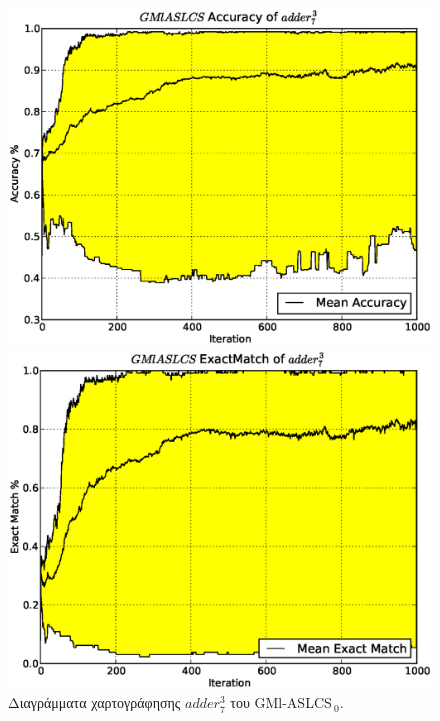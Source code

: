 \begin{figure}[ht]
  \caption{Διαγράμματα χαρτογράφησης $adder_{7}^{3}$ του GMl-ASLCS$_{\:0}$.}
  \label{fig:gmlaslcs0adder7_3}
  \begin{minipage}[b]{0.5\linewidth}
  	\centering
  	\includegraphics[scale=.42]{./images/artificial/gmlaslcs0/base/adder7_3GMlASLCSacc.eps}
  \end{minipage}
  \begin{minipage}[b]{0.5\linewidth}
  	\centering
  	\includegraphics[scale=.42]{./images/artificial/gmlaslcs0/base/adder7_3GMlASLCSex.eps}
  \end{minipage}
\end{figure}

